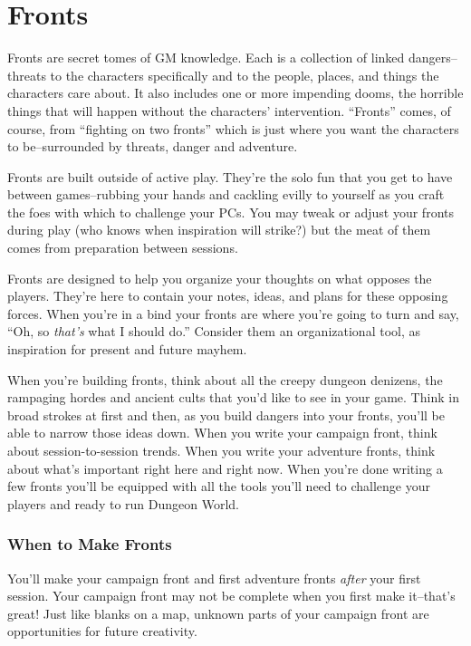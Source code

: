 \chapter{Fronts}

Fronts are secret tomes of GM knowledge. Each is a collection of linked dangers--threats to the characters specifically and to the people, places, and things the characters care about. It also includes one or more impending dooms, the horrible things that will happen without the characters' intervention. ``Fronts'' comes, of course, from ``fighting on two fronts'' which is just where you want the characters to be--surrounded by threats, danger and adventure.


Fronts are built outside of active play. They're the solo fun that you get to have between games--rubbing your hands and cackling evilly to yourself as you craft the foes with which to challenge your PCs. You may tweak or adjust your fronts during play (who knows when inspiration will strike?) but the meat of them comes from preparation between sessions.


Fronts are designed to help you organize your thoughts on what opposes the players. They're here to contain your notes, ideas, and plans for these opposing forces. When you're in a bind your fronts are where you're going to turn and say, ``Oh, so \emph{that's}
what I should do.'' Consider them an organizational tool, as inspiration for present and future mayhem.


When you're building fronts, think about all the creepy dungeon denizens, the rampaging hordes and ancient cults that you'd like to see in your game. Think in broad strokes at first and then, as you build dangers into your fronts, you'll be able to narrow those ideas down. When you write your campaign front, think about session-to-session trends. When you write your adventure fronts, think about what's important right here and right now. When you're done writing a few fronts you'll be equipped with all the tools you'll need to challenge your players and ready to run Dungeon World.
\subsection{When to Make Fronts}


You'll make your campaign front and first adventure fronts \emph{after}
your first session. Your campaign front may not be complete when you first make it--that's great! Just like blanks on a map, unknown parts of your campaign front are opportunities for future creativity.


